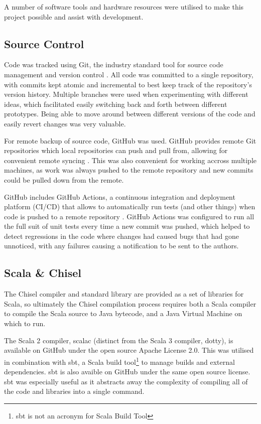 A number of software tools and hardware resources were utilised to make this project possible and assist with development.

\subsection{Source Control}

Code was tracked using Git, the industry standard tool for source code management and version control \cite{git}. All code was committed to a single repository, with commits kept atomic and incremental to best keep track of the repository's version history. Multiple branches were used when experimenting with different ideas, which facilitated easily switching back and forth between different prototypes. Being able to move around between different versions of the code and easily revert changes was very valuable.

For remote backup of source code, GitHub was used. GitHub provides remote Git repositories which local repositories can push and pull from, allowing for convenient remote syncing \cite{github}. This was also convenient for working accross multiple machines, as work was always pushed to the remote repository and new commits could be pulled down from the remote.

GitHub includes GitHub Actions, a continuous integration and deployment platform (CI/CD) that allows to automatically run tests (and other things) when code is pushed to a remote repository  \cite{gha}. GitHub Actions was configured to run all the full suit of unit tests every time a new commit was pushed, which helped to detect regressions in the code where changes had caused bugs that had gone unnoticed, with any failures causing a notification to be sent to the authors.

\subsection{Scala \& Chisel}

The Chisel compiler and standard library are provided as a set of libraries for Scala, so ultimately the Chisel compilation process requires both a Scala compiler to compile the Scala source to Java bytecode, and a Java Virtual Machine on which to run.

The Scala 2 compiler, scalac (distinct from the Scala 3 compiler, dotty), is available on GitHub under the open source Apache License 2.0. This was utilised in combination with sbt, a Scala build tool\footnote{sbt is not an acronym for Scala Build Tool} to manage builds and external dependencies. sbt is also avaible on GitHub under the same open source license. sbt was especially useful as it abstracts away the complexity of compiling all of the code and libraries into a single  command.

